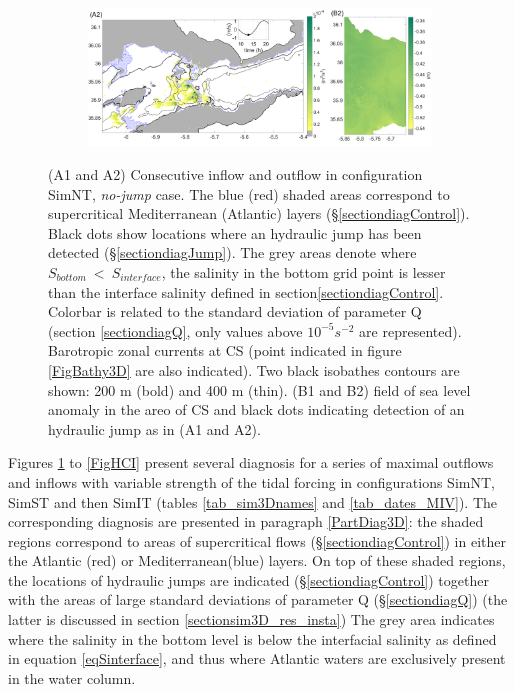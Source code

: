 \begin{figure}[!h]
 \begin{subfigure}{\linewidth}
\centering
\includegraphics[width=\linewidth]{./GBR3D/ME2_13h_p.png}
\end{subfigure}
\caption [Supercritical flow, location of hydraulic jump, standard deviation of parameter $Q$ in SimNT.]{ (A1 and A2) Consecutive inflow and outflow in configuration SimNT, \textit{no-jump} case. The blue (red) shaded areas correspond to supercritical Mediterranean (Atlantic) layers (\S \ref{sectiondiagControl}). Black dots show locations where an hydraulic jump has been detected (\S \ref{sectiondiagJump}). The grey areas denote where $S_{bottom}\ <\ S_{interface}$, the salinity in the bottom grid point is lesser than the interface salinity defined in section\ref{sectiondiagControl}. Colorbar is related to the standard deviation of parameter Q (section \ref{sectiondiagQ}, only values above $10^{-5} s^{-2}$ are represented). Barotropic zonal currents at CS (point indicated in figure \ref{FigBathy3D} are also indicated). Two black isobathes contours are shown: 200 m (bold) and 400 m (thin). (B1 and B2) field of sea level anomaly in the areo of CS and black dots indicating detection of an hydraulic jump as in (A1 and A2).}
\label{FigHCN}
\end{figure}

Figures \ref{FigHCN} to \ref{FigHCI} present several diagnosis for a series of maximal outflows and inflows with variable strength of the tidal forcing in configurations SimNT, SimST and then SimIT (tables \ref{tab_sim3Dnames} and \ref{tab_dates_MIV}). The corresponding diagnosis are presented in paragraph \ref{PartDiag3D}: the shaded regions correspond to areas of supercritical flows (\S \ref{sectiondiagControl}) in either the Atlantic (red) or Mediterranean(blue) layers. On top of these shaded regions, the locations of hydraulic jumps are indicated (\S \ref{sectiondiagControl}) together with the areas of large standard deviations of parameter Q (\S \ref{sectiondiagQ}) (the latter is discussed in section \ref{sectionsim3D_res_insta}) The grey area indicates where the salinity in the bottom level is below the interfacial salinity as defined in equation \ref{eqSinterface}, and thus where Atlantic waters are exclusively present in the water column. 

